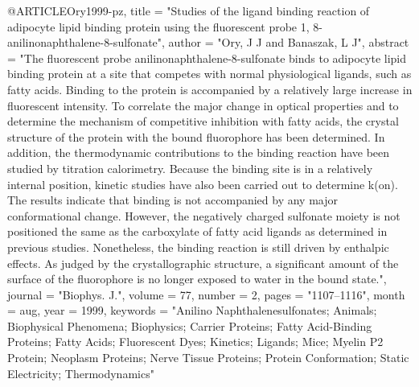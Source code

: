 @ARTICLE{Ory1999-pz,
  title    = "Studies of the ligand binding reaction of adipocyte lipid binding
              protein using the fluorescent probe 1,
              8-anilinonaphthalene-8-sulfonate",
  author   = "Ory, J J and Banaszak, L J",
  abstract = "The fluorescent probe anilinonaphthalene-8-sulfonate binds to
              adipocyte lipid binding protein at a site that competes with
              normal physiological ligands, such as fatty acids. Binding to the
              protein is accompanied by a relatively large increase in
              fluorescent intensity. To correlate the major change in optical
              properties and to determine the mechanism of competitive
              inhibition with fatty acids, the crystal structure of the protein
              with the bound fluorophore has been determined. In addition, the
              thermodynamic contributions to the binding reaction have been
              studied by titration calorimetry. Because the binding site is in
              a relatively internal position, kinetic studies have also been
              carried out to determine k(on). The results indicate that binding
              is not accompanied by any major conformational change. However,
              the negatively charged sulfonate moiety is not positioned the
              same as the carboxylate of fatty acid ligands as determined in
              previous studies. Nonetheless, the binding reaction is still
              driven by enthalpic effects. As judged by the crystallographic
              structure, a significant amount of the surface of the fluorophore
              is no longer exposed to water in the bound state.",
  journal  = "Biophys. J.",
  volume   =  77,
  number   =  2,
  pages    = "1107--1116",
  month    =  aug,
  year     =  1999,
  keywords = "Anilino Naphthalenesulfonates; Animals; Biophysical Phenomena;
              Biophysics; Carrier Proteins; Fatty Acid-Binding Proteins; Fatty
              Acids; Fluorescent Dyes; Kinetics; Ligands; Mice; Myelin P2
              Protein; Neoplasm Proteins; Nerve Tissue Proteins; Protein
              Conformation; Static Electricity; Thermodynamics"
}
